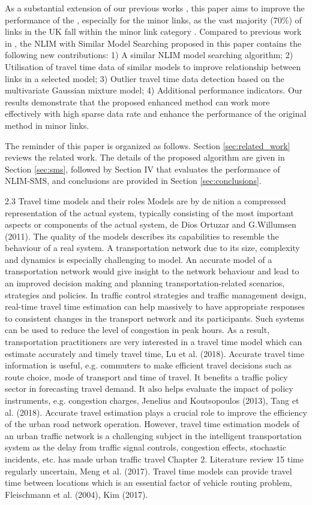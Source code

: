 \documentclass[journal]{IEEEtran}
\begin{document}
As a substantial extension of our previous works \cite{Vu2017}, this paper aims to improve the performance of the \nlim, especially for the minor links, as the vast majority (70\%) of links in the UK fall within the minor link category \cite{DepartmentofTransport2012}. Compared to previous work in \cite{Vu2017}, the NLIM with Similar Model Searching proposed in this paper contains the following new contributions: 1) A similar NLIM model searching algorithm; 2) Utilisation of travel time data of similar models to improve relationship between links in a selected model; 3) Outlier travel time data detection based on the multivariate Gaussian mixture model; 4) Additional performance indicators. Our results demonstrate that the proposed enhanced method can work more effectively with high sparse data rate and enhance the performance of the original method in minor links.

The reminder of this paper is organized as follows. Section \ref{sec:related_work} reviews the related work. The details of the proposed algorithm are given in Section \ref{sec:sms}, followed by Section IV that evaluates the performance of NLIM-SMS, and conclusions are provided in Section \ref{sec:conclusions}.


2.3 Travel time models and their roles
Models are by denition a compressed representation of the actual system, typically consisting
of the most important aspects or components of the actual system, de Dios Ortuzar
and G.Willumsen (2011). The quality of the models describes its capabilities
to resemble the behaviour of a real system. A transportation network due to its size,
complexity and dynamics is especially challenging to model. An accurate model of a
transportation network would give insight to the network behaviour and lead to an improved
decision making and planning transportation-related scenarios, strategies and
policies.
In traffic control strategies and traffic management design, real-time travel time estimation
can help massively to have appropriate responses to consistent changes in the
transport network and its participants. Such systems can be used to reduce the level of
congestion in peak hours. As a result, transportation practitioners are very interested
in a travel time model which can estimate accurately and timely travel time, Lu et al.
(2018).
Accurate travel time information is useful, e.g. commuters to make efficient travel
decisions such as route choice, mode of transport and time of travel. It benefits a traffic
policy sector in forecasting travel demand. It also helps evaluate the impact of policy
instruments, e.g. congestion charges, Jenelius and Koutsopoulos (2013), Tang et al.
(2018).
Accurate travel estimation plays a crucial role to improve the efficiency of the urban road
network operation. However, travel time estimation models of an urban traffic network
is a challenging subject in the intelligent transportation system as the delay from traffic
signal controls, congestion effects, stochastic incidents, etc. has made urban traffic travel
Chapter 2. Literature review 15
time regularly uncertain, Meng et al. (2017). Travel time models can provide travel time
between locations which is an essential factor of vehicle routing problem, Fleischmann
et al. (2004), Kim (2017).
\end{document}
